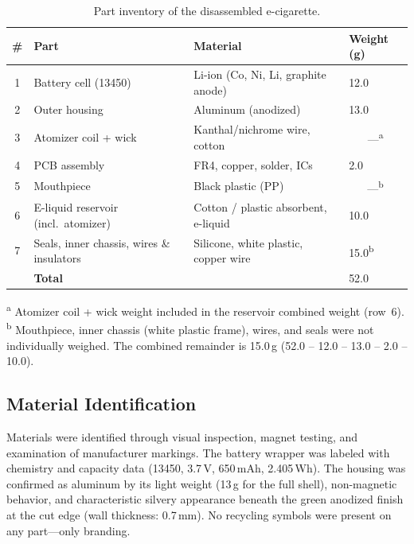 \begin{table}[H]
\centering
\caption{Part inventory of the disassembled e-cigarette.}
\label{tab:parts}
\begin{tabular}{@{}clll@{}}
\toprule
\textbf{\#} & \textbf{Part} & \textbf{Material} & \textbf{Weight (g)} \\
\midrule
1 & Battery cell (13450)   & Li-ion (Co, Ni, Li, graphite anode) & 12.0 \\
2 & Outer housing         & Aluminum (anodized)                  & 13.0 \\
3 & Atomizer coil + wick  & Kanthal/nichrome wire, cotton        & \multicolumn{1}{c}{---\textsuperscript{a}} \\
4 & PCB assembly          & FR4, copper, solder, ICs             & 2.0 \\
5 & Mouthpiece            & Black plastic (PP)                   & \multicolumn{1}{c}{---\textsuperscript{b}} \\
6 & E-liquid reservoir (incl.\ atomizer) & Cotton / plastic absorbent, e-liquid & 10.0 \\
7 & Seals, inner chassis, wires \& insulators & Silicone, white plastic, copper wire & 15.0\textsuperscript{b} \\
\midrule
  & \textbf{Total}        &                                      & 52.0 \\
\bottomrule
\end{tabular}
\end{table}

\noindent\textsuperscript{a} Atomizer coil + wick weight included in the reservoir combined weight (row~6).\\
\textsuperscript{b} Mouthpiece, inner chassis (white plastic frame), wires, and seals were not individually weighed. The combined remainder is 15.0\,g (52.0 -- 12.0 -- 13.0 -- 2.0 -- 10.0).

\subsection{Material Identification}
\label{sec:material_id}

Materials were identified through visual inspection, magnet testing, and examination of manufacturer markings. The battery wrapper was labeled with chemistry and capacity data (13450, 3.7\,V, 650\,mAh, 2.405\,Wh). The housing was confirmed as aluminum by its light weight (13\,g for the full shell), non-magnetic behavior, and characteristic silvery appearance beneath the green anodized finish at the cut edge (wall thickness: 0.7\,mm). No recycling symbols were present on any part---only branding.

